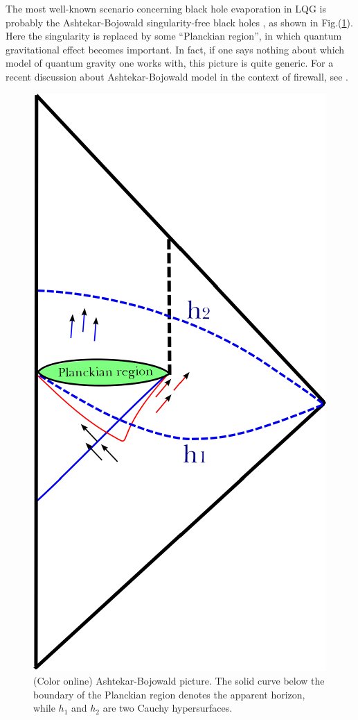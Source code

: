 \documentclass[12pt]{article}
\newcommand{\2}{$^2$}
\newcommand{\3}{$^3$}
\newcommand{\4}{$_4$}
\newcommand{\5}{$_5$}
\begin{document}
The most well-known scenario concerning black hole evaporation in LQG is probably the Ashtekar-Bojowald singularity-free black holes \cite{BA}, as shown in Fig.(\ref{fig:AB_2}).  Here the singularity is replaced by some ``Planckian region'', in which quantum gravitational effect becomes important. In fact, if one says nothing about which model of quantum gravity one works with, this picture is quite generic. For a recent discussion about Ashtekar-Bojowald model in the context of firewall, see \cite{1410.7062}.

\begin{figure}
\begin{center}
\includegraphics[scale=0.95]{AB_2-eps-converted-to.pdf}
\caption{\label{fig:AB_2}(Color online) Ashtekar-Bojowald picture. The solid curve below the boundary of the Planckian region denotes the apparent horizon, while $h_1$ and $h_2$ are two Cauchy hypersurfaces.}
\end{center}
\end{figure} 
\end{document}
